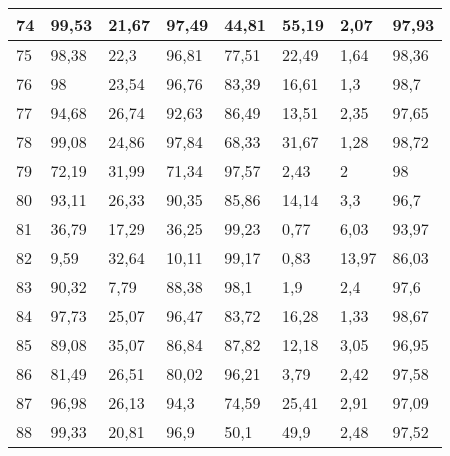 \begin{longtable}[c]{|l|l|l|l|l|l|l|l|}
74              & 99,53        & 21,67        & 97,49       & 44,81         & 55,19         & 2,07          & 97,93         \\ \hline
75              & 98,38        & 22,3         & 96,81       & 77,51         & 22,49         & 1,64          & 98,36         \\ \hline
76              & 98           & 23,54        & 96,76       & 83,39         & 16,61         & 1,3           & 98,7          \\ \hline
77              & 94,68        & 26,74        & 92,63       & 86,49         & 13,51         & 2,35          & 97,65         \\ \hline
78              & 99,08        & 24,86        & 97,84       & 68,33         & 31,67         & 1,28          & 98,72         \\ \hline
79              & 72,19        & 31,99        & 71,34       & 97,57         & 2,43          & 2             & 98            \\ \hline
80              & 93,11        & 26,33        & 90,35       & 85,86         & 14,14         & 3,3           & 96,7          \\ \hline
81              & 36,79        & 17,29        & 36,25       & 99,23         & 0,77          & 6,03          & 93,97         \\ \hline
82              & 9,59         & 32,64        & 10,11       & 99,17         & 0,83          & 13,97         & 86,03         \\ \hline
83              & 90,32        & 7,79         & 88,38       & 98,1          & 1,9           & 2,4           & 97,6          \\ \hline
84              & 97,73        & 25,07        & 96,47       & 83,72         & 16,28         & 1,33          & 98,67         \\ \hline
85              & 89,08        & 35,07        & 86,84       & 87,82         & 12,18         & 3,05          & 96,95         \\ \hline
86              & 81,49        & 26,51        & 80,02       & 96,21         & 3,79          & 2,42          & 97,58         \\ \hline
87              & 96,98        & 26,13        & 94,3        & 74,59         & 25,41         & 2,91          & 97,09         \\ \hline
88              & 99,33        & 20,81        & 96,9        & 50,1          & 49,9          & 2,48          & 97,52         \\ \hline

\end{longtable}
